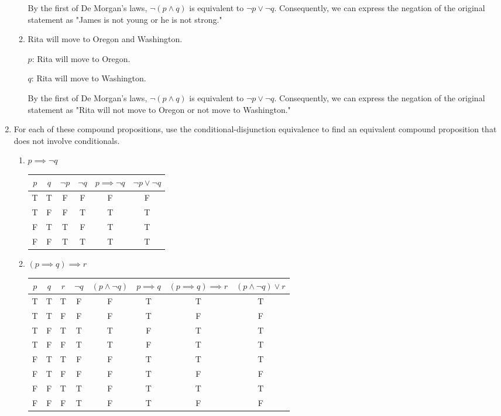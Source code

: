 \documentclass[11pt]{article}
\begin{document}
\begin{enumerate}[label=\textbf{\arabic*.}]
\begin{enumerate}[label=\textbf{\alph*)}]
		By the first of De Morgan's laws, $\neg(p \land q)$ is equivalent to $\neg p \lor \neg q$. Consequently, we can express the negation of the original statement as "James is not young or he is not strong."
		
		\item Rita will move to Oregon and Washington.
		
		\hspace{1em}$p$: Rita will move to Oregon.
		
		\hspace{1em}$q$: Rita will move to Washington.
		
		By the first of De Morgan's laws, $\neg(p \land q)$ is equivalent to $\neg p \lor \neg q$. Consequently, we can express the negation of the original statement as "Rita will not move to Oregon or not move to Washington."
	\end{enumerate}

	\item For each of these compound propositions, use the conditional-disjunction equivalence to find an equivalent compound proposition that does not involve conditionals.
	\begin{enumerate}[label=\textbf{\alph*)}]
		\item $p \implies \neg q$
		
		\begin{tabular}{c | c | c | c | c | c}
			$p$ & $q$ & $\neg p$ & $\neg q$ & $p \implies \neg q$ & $\neg p \lor \neg q$ \\
			\hline
			T & T & F & F & F & F \\
			T & F & F & T & T & T \\
			F & T & T & F & T & T \\
			F & F & T & T & T & T
		\end{tabular}
		
		\item $(p \implies q) \implies r$
		
		\begin{tabular}{c | c | c | c | c | c | c | c}
			$p$ & $q$ & $r$ & $\neg q$ & $(p \land \neg q)$ & $p \implies q$ & $(p \implies q) \implies r$ & $(p \land \neg q) \lor r$ \\
			\hline
			T & T & T & F & F & T & T & T \\
			T & T & F & F & F & T & F & F\\
			T & F & T & T & T & F & T & T \\
			T & F & F & T & T & F & T & T \\
			F & T & T & F & F & T & T & T \\
			F & T & F & F & F & T & F & F \\
			F & F & T & T & F & T & T & T \\
			F & F & F & T & F & T & F & F
		\end{tabular}
	

\end{enumerate}
\end{enumerate}
\end{document}
